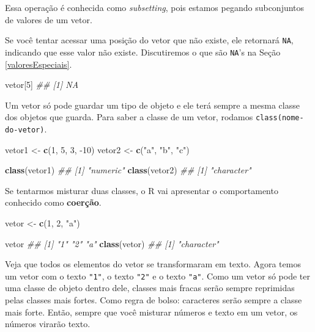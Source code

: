 \documentclass[]{book}
\newenvironment{Shaded}{\begin{snugshade}}{\end{snugshade}}
\newcommand{\CommentTok}[1]{\textcolor[rgb]{0.56,0.35,0.01}{\textit{#1}}}
\newcommand{\DecValTok}[1]{\textcolor[rgb]{0.00,0.00,0.81}{#1}}
\newcommand{\KeywordTok}[1]{\textcolor[rgb]{0.13,0.29,0.53}{\textbf{#1}}}
\newcommand{\NormalTok}[1]{#1}
\newcommand{\StringTok}[1]{\textcolor[rgb]{0.31,0.60,0.02}{#1}}
\begin{document}
Essa operação é conhecida como \emph{subsetting}, pois estamos pegando subconjuntos de valores de um vetor.

Se você tentar acessar uma posição do vetor que não existe, ele retornará \texttt{NA}, indicando que esse valor não existe. Discutiremos o que são \texttt{NA}'s na Seção \ref{valoresEspeciais}.

\begin{Shaded}
\begin{Highlighting}[]
\NormalTok{vetor[}\DecValTok{5}\NormalTok{]}
\CommentTok{## [1] NA}
\end{Highlighting}
\end{Shaded}

Um vetor só pode guardar um tipo de objeto e ele terá sempre a mesma classe dos objetos que guarda. Para saber a classe de um vetor, rodamos \texttt{class(nome-do-vetor)}.

\begin{Shaded}
\begin{Highlighting}[]
\NormalTok{vetor1 <-}\StringTok{ }\KeywordTok{c}\NormalTok{(}\DecValTok{1}\NormalTok{, }\DecValTok{5}\NormalTok{, }\DecValTok{3}\NormalTok{, }\DecValTok{-10}\NormalTok{)}
\NormalTok{vetor2 <-}\StringTok{ }\KeywordTok{c}\NormalTok{(}\StringTok{"a"}\NormalTok{, }\StringTok{"b"}\NormalTok{, }\StringTok{"c"}\NormalTok{)}

\KeywordTok{class}\NormalTok{(vetor1)}
\CommentTok{## [1] "numeric"}
\KeywordTok{class}\NormalTok{(vetor2)}
\CommentTok{## [1] "character"}
\end{Highlighting}
\end{Shaded}

Se tentarmos misturar duas classes, o R vai apresentar o comportamento conhecido como \textbf{coerção}.

\begin{Shaded}
\begin{Highlighting}[]
\NormalTok{vetor <-}\StringTok{ }\KeywordTok{c}\NormalTok{(}\DecValTok{1}\NormalTok{, }\DecValTok{2}\NormalTok{, }\StringTok{"a"}\NormalTok{)}

\NormalTok{vetor}
\CommentTok{## [1] "1" "2" "a"}
\KeywordTok{class}\NormalTok{(vetor)}
\CommentTok{## [1] "character"}
\end{Highlighting}
\end{Shaded}

Veja que todos os elementos do vetor se transformaram em texto. Agora temos um vetor com o texto \texttt{"1"}, o texto \texttt{"2"} e o texto \texttt{"a"}. Como um vetor só pode ter uma classe de objeto dentro dele, classes mais fracas serão sempre reprimidas pelas classes mais fortes. Como regra de bolso: caracteres serão sempre a classe mais forte. Então, sempre que você misturar números e texto em um vetor, os números virarão texto.
\end{document}
